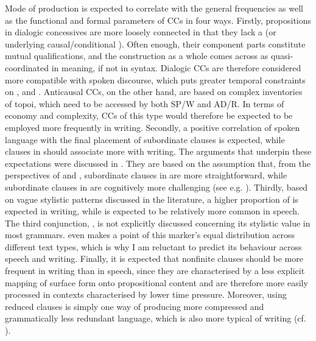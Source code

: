 \begin{sloppypar}
Mode of production is expected to correlate with the general frequencies as well as the functional and formal parameters of CCs in four ways. Firstly, propositions in dialogic concessives are more loosely connected in that they lack a  (or underlying causal\slash conditional ). Often enough, their component parts constitute mutual qualifications, and the construction as a whole comes across as quasi-coordinated in meaning, if not in syntax. Dialogic CCs are therefore considered more compatible with spoken discourse, which puts greater temporal constraints on ,  and . Anticausal CCs, on the other hand, are based on complex inventories of topoi, which need to be accessed by both SP/W and AD/R. In terms of economy and complexity, CCs of this type would therefore be expected to be employed more frequently in writing. Secondly, a positive correlation of spoken language with the final placement of subordinate clauses is expected, while clauses in  should associate more with writing. The arguments that underpin these expectations were discussed in . They are based on the assumption that, from the perspectives of  and , subordinate clauses in  are more straightforward, while subordinate clauses in  are cognitively more challenging (see e.g. \citealt{Hawkins1994, Hawkins2000}). Thirdly, based on vague stylistic patterns discussed in the literature, a higher proportion of  is expected in writing, while  is expected to be relatively more common in speech. The third conjunction, , is not explicitly discussed concerning its stylistic value in most grammars. \citet{Aarts1988} even makes a point of this marker’s equal distribution across different text types, which is why I am reluctant to predict its behaviour across speech and writing. Finally, it is expected that nonfinite clauses should be more frequent in writing than in speech, since they are characterised by a less explicit mapping of surface form onto propositional content and are therefore more easily processed in contexts characterised by lower time pressure. Moreover, using reduced clauses is simply one way of producing more compressed and grammatically less redundant language, which is also more typical of writing (cf. ).
\end{sloppypar}

